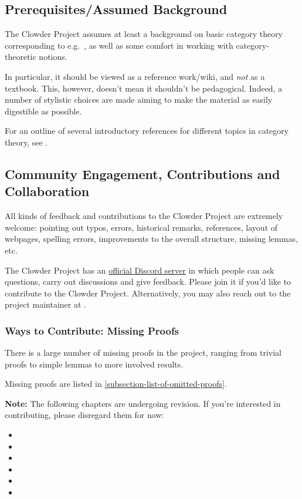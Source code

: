\subsection{Prerequisites/Assumed Background}\label{subsection-prerequisites-assumed-background}
The Clowder Project assumes at least a background on basic category theory corresponding to e.g.\ \cite{category-theory-in-context}, as well as some comfort in working with category-theoretic notions.

In particular, it should be viewed as a reference work/wiki, and \emph{not} as a textbook. This, however, doesn't mean it shouldn't be pedagogical. Indeed, a number of stylistic choices are made aiming to make the material as easily digestible as possible.

For an outline of several introductory references for different topics in category theory, see \ChapterAGuideToTheLiterature.
\subsection{Community Engagement, Contributions and Collaboration}\label{subsection-community-engagement-contributions-and-collaboration}
All kinds of feedback and contributions to the Clowder Project are extremely welcome: pointing out typos, errors, historical remarks, references, layout of webpages, spelling errors, improvements to the overall structure, missing lemmas, etc.

The Clowder Project has an \href{https://discord.gg/b98uG2MWgc}{official Discord server} in which people can ask questions, carry out discussions and give feedback. Please join it if you'd like to contribute to the Clowder Project. Alternatively, you may also reach out to the project maintainer at \href{mailto:emily.de.oliveira.santos.tmf@gmail.com}{}.
\subsubsection{Ways to Contribute: Missing Proofs}\label{subsubsection-ways-to-contribute-missing-proofs}
There is a large number of missing proofs in the project, ranging from trivial proofs to simple lemmas to more involved results.

Missing proofs are listed in \cref{subsection-list-of-omitted-proofs}.

\textbf{Note: }The following chapters are undergoing revision. If you're interested in contributing, please disregard them for now:
\begin{itemize}
    \item \ChapterRelations
    \item \ChapterConstructionsWithRelations
    \item \ChapterConditionsOnRelations
    \item \ChapterCategories
    \item \ChapterConstructionsWithMonoidalCategories
    \item \ChapterTypesOfMorphismsInBicategories
\end{itemize}
